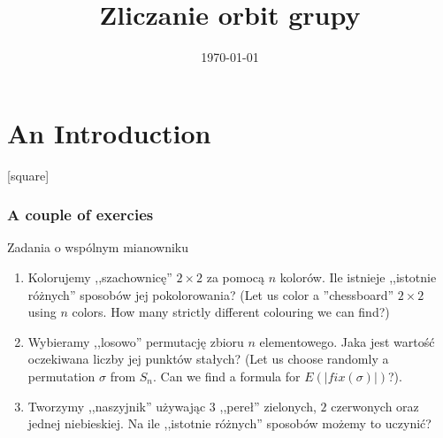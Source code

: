 \documentclass[a4paper, 11pt, xcolor=dvipsnames]{beamer}
\begin{document}
 
\title{
  Zliczanie orbit grupy
} 
\author{} 
\date{\today}
\begin{frame} 
  \titlepage 
\end{frame} 
\section{An Introduction}

[square] %

\begin{frame}\frametitle{A couple of exercies}
\begin{block}{Zadania o wspólnym mianowniku}
\end{block}
\begin{enumerate}

\item<1->{
Kolorujemy ,,szachownicę'' $2 \times 2$ za pomocą $n$ kolorów.
Ile istnieje ,,istotnie różnych'' sposobów jej pokolorowania?
(Let us color a ''chessboard'' $2 \times 2$ using $n$ colors.
How many strictly different colouring we can find?)
}
\item<2->{
Wybieramy ,,losowo'' permutację zbioru $n$ elementowego.
Jaka jest wartość oczekiwana liczby jej punktów stałych?
(Let us choose randomly a permutation $\sigma$ from $S_n$. Can we
find a formula for $E(|fix(\sigma)|)$?).
}
\item<3->{
Tworzymy ,,naszyjnik'' używając $3$ ,,pereł'' zielonych, $2$ czerwonych oraz jednej niebieskiej.
Na ile ,,istotnie różnych'' sposobów możemy to uczynić?
}
\end{enumerate}
\end{frame}
\end{document}
